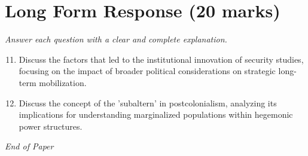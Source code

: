 \documentclass[12pt]{article}
\begin{document}
\section*{Long Form Response (20 marks)}
\textit{Answer each question with a clear and complete explanation.}
\begin{enumerate}[label=\arabic*.]
\setcounter{enumi}{10}
\item Discuss the factors that led to the institutional innovation of security studies, focusing on the impact of broader political considerations on strategic long-term mobilization.
\item Discuss the concept of the 'subaltern' in postcolonialism, analyzing its implications for understanding marginalized populations within hegemonic power structures.
\end{enumerate}

\vfill
\noindent\textit{End of Paper}
\end{document}
